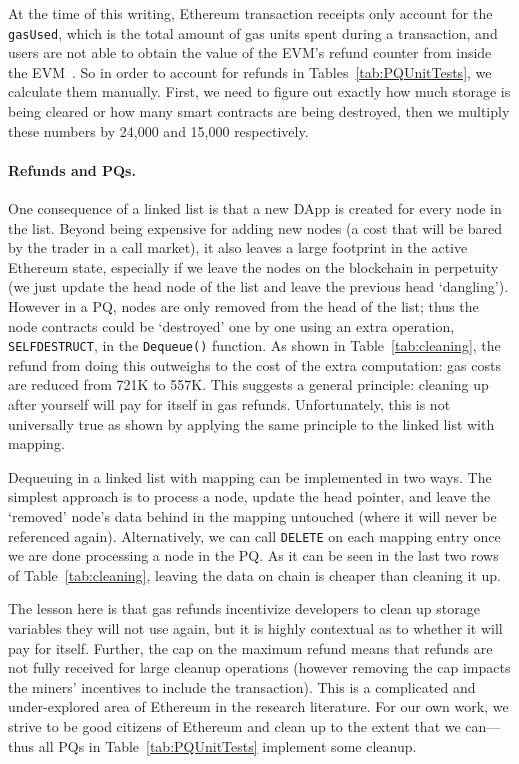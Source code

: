At the time of this writing, Ethereum transaction receipts only account for the \texttt{gasUsed}, which is the total amount of gas units spent during a transaction, and users are not able to obtain the value of the EVM's refund counter from inside the EVM~\cite{signer2018gas}. So in order to account for refunds in Tables~\ref{tab:PQUnitTests}, we calculate them manually. First, we need to figure out exactly how much storage is being cleared or how many smart contracts are being destroyed, then we multiply these numbers by 24,000 and 15,000 respectively. 

\paragraph{Refunds and PQs.}

One consequence of a linked list is that a new DApp is created for every node in the list. Beyond being expensive for adding new nodes (a cost that will be bared by the trader in a call market), it also leaves a large footprint in the active Ethereum state, especially if we leave the nodes on the blockchain in perpetuity (\ie we just update the head node of the list and leave the previous head `dangling'). However in a PQ, nodes are only removed from the head of the list; thus the node contracts could be `destroyed' one by one using an extra operation, \texttt{SELFDESTRUCT}, in the \texttt{Dequeue()} function. As shown in Table~\ref{tab:cleaning}, the refund from doing this outweighs to the cost of the extra computation: gas costs are reduced from 721K to 557K.  This suggests a general principle: cleaning up after yourself will pay for itself in gas refunds. Unfortunately, this is not universally true as shown by applying the same principle to the linked list with mapping. 

Dequeuing in a linked list with mapping can be implemented in two ways. The simplest approach is to process a node, update the head pointer, and leave the `removed' node's data behind in the mapping untouched (where it will never be referenced again). Alternatively, we can call \texttt{DELETE} on each mapping entry once we are done processing a node in the PQ. As it can be seen in the last two rows of Table~\ref{tab:cleaning}, leaving the data on chain is cheaper than cleaning it up.

The lesson here is that gas refunds incentivize developers to clean up storage variables they will not use again, but it is highly contextual as to whether it will pay for itself. Further, the cap on the maximum refund means that refunds are not fully received for large cleanup operations (however removing the cap impacts the miners' incentives to include the transaction). This is a complicated and under-explored area of Ethereum in the research literature. For our own work, we strive to be good citizens of Ethereum and clean up to the extent that we can---thus all PQs in Table~\ref{tab:PQUnitTests} implement some cleanup.





